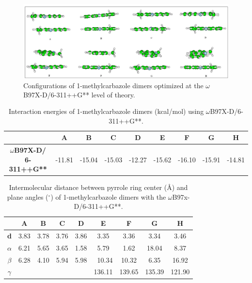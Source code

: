 \begin{figure}[H]
	\centering
	\includegraphics[scale=0.42]{image/1-methylcarbazole}
	\caption{Configurations of 1-methylcarbazole dimers optimized at the $\omega$B97X-D/6-311++G** level of theory.}
\end{figure}



\begin{table}[H]
	\caption{Interaction energies of 1-methylcarbazole dimers (kcal/mol) using $\omega$B97X-D/6-311++G**.}
	\begin{center}
		\begin{tabular}{c c c c c c c c c}
			\hline
			& A & B & C & D & E & F & G & H \\ \hline
			\textbf{$\omega$B97X-D/
				6-311++G**} & -11.81 & -15.04 & -15.03 & -12.27 & -15.62 & -16.10 & -15.91 & -14.81 \\ \hline
		\end{tabular}
	\end{center}
	\label{}
\end{table}

	\begin{table}[H]
		\caption{Intermolecular distance between pyrrole ring center (Å) and plane angles ($^{\circ}$)  of 1-methylcarbazole dimers with the $\omega$B97x-D/6-311++G**.}
		\begin{center}
			\begin{tabular}{ c c c c c c c c c}
				\hline
				\multicolumn{1}{l}{} & \textbf{A} & \textbf{B} & \textbf{C} & \textbf{D} & \textbf{E} & \textbf{F} & \textbf{G} & \textbf{H} \\ \hline
				\textbf{d
				} & 3.83 & 3.78 & 3.76 & 3.86 & 3.35 & 3.36 & 3.34 & 3.46 \\ 
				\textbf{$\alpha$
				} & 6.21 & 5.65 & 3.65 & 1.58 & 5.79 & 1.62 & 18.04 & 8.37 \\ 
				\textbf{$\beta$
				} & 6.28 & 4.10 & 5.94 & 5.98 & \multicolumn{1}{r}{10.34} & 10.32 & 6.35 & 16.92 \\ 
				\textbf{$\gamma$
				} &  &  &  &  & 136.11 & 139.65 & 135.39 & 121.90 \\ \hline
			\end{tabular}
		\end{center}
		\label{}
	\end{table}



